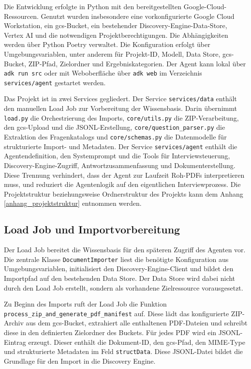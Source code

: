 \documentclass[
  10pt,
  ngerman,
  a4paper,
  toc=graduated,
  numbers=noenddot,
  headings=standardclasses,
  nonumberlist
]{scrartcl}
\newcommand{\code}[1]{\nolinkurl{#1}}
\begin{document}
Die Entwicklung erfolgte in Python mit den bereitgestellten Google-Cloud-Ressourcen. Genutzt wurden insbesondere eine vorkonfigurierte Google Cloud Workstation, ein \gls{gcs}-Bucket, ein bestehender Discovery-Engine-Data-Store, Vertex AI und die notwendigen Projektberechtigungen. Die Abhängigkeiten werden über Python Poetry verwaltet. Die Konfiguration erfolgt über Umgebungsvariablen, unter anderem für Projekt-ID, Modell, Data Store, \gls{gcs}-Bucket, ZIP-Pfad, Zielordner und Ergebniskategorien. Der Agent kann lokal über \texttt{adk run src} oder mit Weboberfläche über \texttt{adk web} im Verzeichnis \code{services/agent} gestartet werden.

Das Projekt ist in zwei Services gegliedert. Der Service \code{services/data} enthält den manuellen Load Job zur Vorbereitung der Wissensbasis. Darin übernimmt \code{load.py} die Orchestrierung des Imports, \code{core/utils.py} die ZIP-Verarbeitung, den \gls{gcs}-Upload und die JSONL-Erstellung, \code{core/question\_parser.py} die Extraktion des Fragenkatalogs und \code{core/schemas.py} die Datenmodelle für strukturierte Import- und Metadaten. Der Service \code{services/agent} enthält die Agentendefinition, den Systemprompt und die Tools für Interviewsteuerung, Discovery-Engine-Zugriff, Antwortzusammenfassung und Dokumenterstellung. Diese Trennung verhindert, dass der Agent zur Laufzeit Roh-PDFs interpretieren muss, und reduziert die Agentenlogik auf den eigentlichen Interviewprozess. Die Projektstruktur beziehungsweise Ordnerstruktur des Projekts kann dem Anhang \ref{anhang_projektstruktur} entnommen werden.

\subsection{Load Job und Importvorbereitung}
\label{load_job_und_importvorbereitung}
Der Load Job bereitet die Wissensbasis für den späteren Zugriff des Agenten vor. Die zentrale Klasse \code{DocumentImporter} liest die benötigte Konfiguration aus Umgebungsvariablen, initialisiert den Discovery-Engine-Client und bildet den Importpfad auf den bestehenden Data Store. Der Data Store wird dabei nicht durch den Load Job erstellt, sondern als vorhandene Zielressource vorausgesetzt.

Zu Beginn des Imports ruft der Load Job die Funktion \code{process\_zip\_and\_generate\_pdf\_manifest} auf. Diese lädt das konfigurierte ZIP-Archiv aus dem \gls{gcs}-Bucket, extrahiert alle enthaltenen PDF-Dateien und schreibt diese in den definierten Zielordner des Buckets. Für jedes PDF wird ein JSONL-Eintrag erzeugt. Dieser enthält die Dokument-ID, den \gls{gcs}-Pfad, den MIME-Type und strukturierte Metadaten im Feld \code{structData}. Diese JSONL-Datei bildet die Grundlage für den Import in die Discovery Engine.
\end{document}
